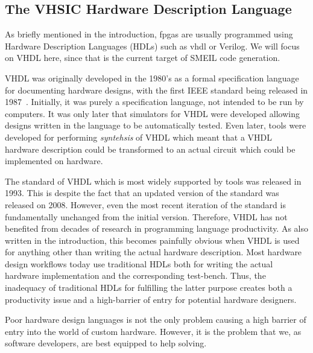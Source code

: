 \subsection{The VHSIC Hardware Description Language}
As briefly mentioned in the introduction, \glspl{fpga} are usually programmed
using Hardware Description Languages (HDLs) such as \gls{vhdl} or Verilog. We
will focus on VHDL here, since that is the current target of SMEIL code
generation.

VHDL was originally developed in the 1980's as a formal specification language
for documenting hardware designs, with the first IEEE standard being released in
1987~\cite{ashenden2001vhdl}. Initially, it was purely a specification language,
not intended to be run by computers. It was only later that simulators for VHDL
were developed allowing designs written in the language to be automatically
tested. Even later, tools were developed for performing {\it syntehsis} of VHDL
which meant that a VHDL hardware description could be transformed to an actual
circuit which could be implemented on hardware.

The standard of VHDL which is most widely supported by tools was released in
1993. This is despite the fact that an updated version of the standard was
released on 2008. However, even the most recent iteration of the standard is
fundamentally unchanged from the initial version. Therefore, VHDL has not
benefited from decades of research in programming language productivity. As also
written in the introduction, this becomes painfully obvious when VHDL is used
for anything other than writing the actual hardware description. Most hardware
design workflows today use traditional HDLs both for writing the actual hardware
implementation and the corresponding test-bench. Thus, the inadequacy of
traditional HDLs for fulfilling the latter purpose creates both a productivity
issue and a high-barrier of entry for potential hardware designers.

Poor hardware design languages is not the only problem causing a high barrier of
entry into the world of custom hardware. However, it is the problem that we, as
software developers, are best equipped to help solving.




